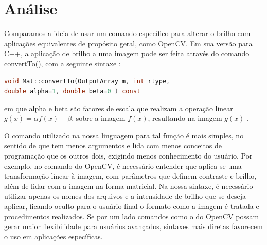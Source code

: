 \documentclass[a4paper, 10pt, conference]{ieeeconf}
\begin{document}
\section{Análise}


Comparamos a ideia de usar um comando específico para alterar o brilho com aplicações equivalentes de propósito geral, como OpenCV. Em sua versão para C++, a aplicação de brilho a uma imagem pode ser feita através do comando convertTo(), com a seguinte sintaxe \cite{opencv2}:
\begin{lstlisting}[language=C, basicstyle=\footnotesize]
void Mat::convertTo(OutputArray m, int rtype, 
double alpha=1, double beta=0 ) const
\end{lstlisting}
em que alpha e beta são fatores de escala que realizam a operação linear $g(x)=\alpha f(x) + \beta$, sobre a imagem $f(x)$, resultando na imagem $g(x)$ \cite{opencv}.

O comando utilizado na nossa linguagem para tal função é mais simples, no sentido de que tem menos argumentos e lida com menos conceitos de programação que os outros dois, exigindo menos conhecimento do usuário. Por exemplo, no comando do OpenCV, é necessário entender que aplica-se uma transformação linear à imagem, com parâmetros que definem contraste e brilho, além de lidar com a imagem na forma matricial. Na nossa sintaxe, é necessário utilizar apenas os nomes dos arquivos e a intensidade de brilho que se deseja aplicar, ficando oculto para o usuário final o formato como a imagem é tratada e procedimentos realizados.
Se por um lado comandos como o do OpenCV possam gerar maior flexibilidade para usuários avançados, sintaxes mais diretas favorecem o uso em aplicações específicas.
\end{document}
